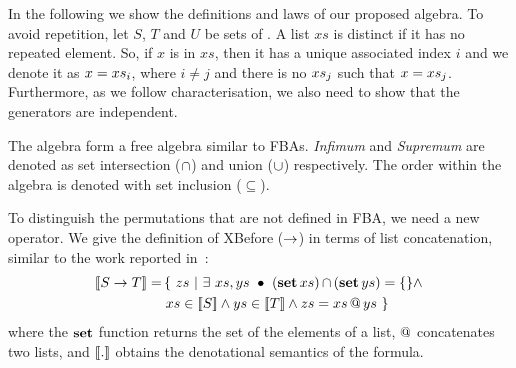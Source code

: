 


In the following we show the definitions and laws of our proposed \ac{algebra}.
To avoid repetition, let $S$, $T$ and $U$ be sets of \distinctlists.
A list $xs$ is distinct if it has no repeated element.
So, if $x$ is in $xs$, then it has a unique associated index $i$ and we denote it as $x = xs_{i}$, where $i \neq j$ and there is no $xs_{j}$ such that $x=xs_{j}$.
Furthermore, as we follow  characterisation, we also need to show that the generators are independent.

The \ac{algebra} form a free algebra similar to \acp{FBA}.
\emph{Infimum} and \emph{Supremum} are denoted as set intersection ($\operatorname{\cap}$) and union ($\operatorname{\cup}$) respectively.
The order within the algebra is denoted with set inclusion ($\subseteq$).

To distinguish the permutations that are not defined in \ac{FBA}, we need a new operator.
We give the definition of \ac{XBefore} ($\rightarrow$) in terms of list concatenation, similar to the work reported in~\cite{DM2015}:
%
\begin{align}
\left[\!\left[S \rightarrow T\right]\!\right] = &
  \left\{~
    zs ~\middle|~ \exists~ xs, ys ~\bullet~ \left( \operatorname{\mathbf{set}} xs \right) \operatorname{\cap} \left( \operatorname{\mathbf{set}} ys \right) = \{\} \land \right.\nonumber\\
  & \left. xs \in \left[\!\left[S\right]\!\right] \land ys \in \left[\!\left[T\right]\!\right] \land zs = xs \operatorname{\mathbf{@}} ys
  ~\right\}\label{def:xbefore-append}
\end{align}
%
where the $\operatorname{\mathbf{set}}$ function returns the set of the elements of a list, $\operatorname{\mathbf{@}}$ concatenates two lists, and $\left[\!\left[.\right]\!\right]$ obtains the denotational semantics of the formula.


